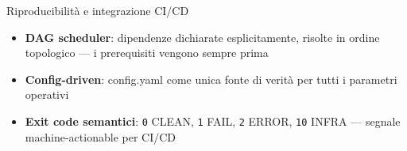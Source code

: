 
\begin{frame}{Riproducibilità e integrazione CI/CD}
  \begin{itemize}
    \item \textbf{DAG scheduler}: dipendenze dichiarate esplicitamente, risolte in ordine \alert{topologico} — i prerequisiti vengono sempre prima

    \item \textbf{Config-driven}: \alert{config.yaml} come unica fonte di verità per tutti i parametri operativi

    \item \textbf{Exit code semantici}: \texttt{0} CLEAN, \texttt{1} FAIL, \texttt{2} ERROR, \texttt{10} INFRA — segnale \alert{machine-actionable} per CI/CD
  \end{itemize}
\end{frame}